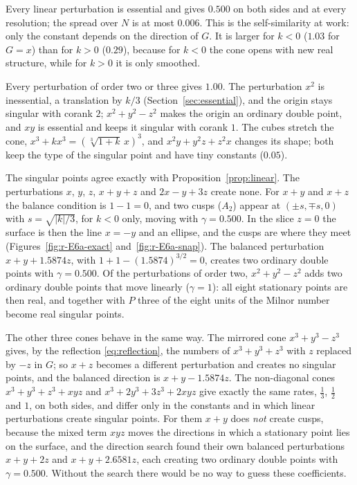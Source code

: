 \documentclass[12pt, a4paper, oneside]{book}
\theoremstyle{plain}
\theoremstyle{definition}
\theoremstyle{remark}
\theoremstyle{definition}
\begin{document}
Every linear perturbation is essential and gives $0.500$ on both sides and at every resolution; the spread over $N$ is at most $0.006$. This is the self-similarity at work: only the constant depends on the direction of $G$. It is larger for $k<0$ ($1.03$ for $G=x$) than for $k>0$ ($0.29$), because for $k<0$ the cone opens with new real structure, while for $k>0$ it is only smoothed.

Every perturbation of order two or three gives $1.00$. The perturbation $x^2$ is inessential, a translation by $k/3$ (Section~\ref{sec:essential}), and the origin stays singular with corank $2$; $x^2+y^2-z^2$ makes the origin an ordinary double point, and $xy$ is essential and keeps it singular with corank $1$. The cubes stretch the cone, $x^3+kx^3=(\sqrt[3]{1+k}\,x)^3$, and $x^2y+y^2z+z^2x$ changes its shape; both keep the type of the singular point and have tiny constants ($0.05$).

The singular points agree exactly with Proposition~\ref{prop:linear}. The perturbations $x$, $y$, $z$, $x+y+z$ and $2x-y+3z$ create none. For $x+y$ and $x+z$ the balance condition is $1-1=0$, and two cusps ($A_2$) appear at $(\pm s,\mp s,0)$ with $s=\sqrt{|k|/3}$, for $k<0$ only, moving with $\gamma=0.500$. In the slice $z=0$ the surface is then the line $x=-y$ and an ellipse, and the cusps are where they meet (Figures~\ref{fig:r-E6a-exact} and~\ref{fig:r-E6a-snap}). The balanced perturbation $x+y+1.5874z$, with $1+1-(1.5874)^{3/2}=0$, creates two ordinary double points with $\gamma=0.500$. Of the perturbations of order two, $x^2+y^2-z^2$ adds two ordinary double points that move linearly ($\gamma=1$): all eight stationary points are then real, and together with $P$ three of the eight units of the Milnor number become real singular points.

The other three cones behave in the same way. The mirrored cone $x^3+y^3-z^3$ gives, by the reflection \eqref{eq:reflection}, the numbers of $x^3+y^3+z^3$ with $z$ replaced by $-z$ in $G$; so $x+z$ becomes a different perturbation and creates no singular points, and the balanced direction is $x+y-1.5874z$. The non-diagonal cones $x^3+y^3+z^3+xyz$ and $x^3+2y^3+3z^3+2xyz$ give exactly the same rates, $\tfrac13$, $\tfrac12$ and $1$, on both sides, and differ only in the constants and in which linear perturbations create singular points. For them $x+y$ does \emph{not} create cusps, because the mixed term $xyz$ moves the directions in which a stationary point lies on the surface, and the direction search found their own balanced perturbations $x+y+2z$ and $x+y+2.6581z$, each creating two ordinary double points with $\gamma=0.500$. Without the search there would be no way to guess these coefficients.
\clearpage
\end{document}
